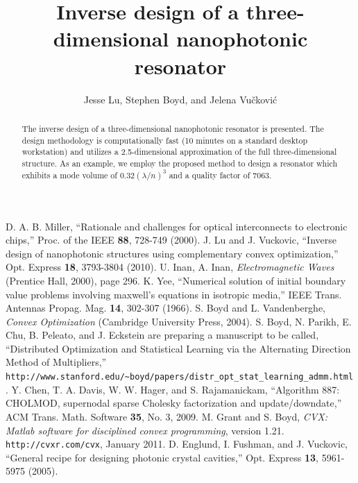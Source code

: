 \documentclass[10pt,letterpaper]{article}
\begin{document}
\title{Inverse design of a three-dimensional nanophotonic resonator}
\author{Jesse Lu, Stephen Boyd, and Jelena Vu\v{c}kovi\'{c}}
\address{Stanford University, \\ Stanford, C.A., 94305}


\begin{abstract} 
The inverse design of a three-dimensional nanophotonic resonator is presented. The design methodology is computationally fast (10 minutes on a standard desktop workstation) and utilizes a 2.5-dimensional approximation of the full three-dimensional structure. As an example, we employ the proposed method to design a resonator which exhibits a mode volume of $0.32(\lambda/n)^3$ and a quality factor of $7063$. %
\end{abstract}


\begin{thebibliography}{99}
 D. A. B. Miller, ``Rationale and challenges for optical interconnects to electronic chips,'' Proc. of the IEEE \textbf{88}, 728-749 (2000).
 J. Lu and J. Vuckovic, ``Inverse design of nanophotonic structures using complementary convex optimization,'' Opt. Express \textbf{18}, 3793-3804 (2010).
 U. Inan, A. Inan, \emph{Electromagnetic Waves} (Prentice Hall, 2000), page 296.
 K. Yee, ``Numerical solution of initial boundary value problems involving maxwell's equations in isotropic media,'' IEEE Trans. Antennas Propag. Mag. \textbf{14}, 302-307 (1966).
 S. Boyd and L. Vandenberghe, \emph{Convex Optimization} (Cambridge University Press, 2004).
 S. Boyd, N. Parikh, E. Chu, B. Peleato, and J. Eckstein are preparing a manuscript to be called, ``Distributed Optimization and Statistical Learning via the Alternating Direction Method of Multipliers,'' \verb+http://www.stanford.edu/~boyd/papers/distr_opt_stat_learning_admm.html+. 
 Y. Chen, T. A. Davis, W. W. Hager, and S. Rajamanickam, ``Algorithm 887: CHOLMOD, supernodal sparse Cholesky factorization and update/downdate,'' ACM Trans. Math. Software \textbf{35}, No. 3, 2009.
 M. Grant and S. Boyd, \emph{CVX: Matlab software for disciplined convex programming}, version 1.21. \verb+http://cvxr.com/cvx+, January 2011.
 D. Englund, I. Fushman, and J. Vuckovic, ``General recipe for designing photonic crystal cavities,'' Opt. Express \textbf{13}, 5961-5975 (2005).
\end{thebibliography}
 
\end{document}

